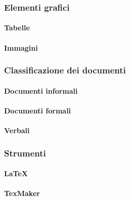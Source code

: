 \subsubsection{Elementi grafici}
 \paragraph{Tabelle} 
 \paragraph{Immagini}

\subsubsection{Classificazione dei documenti}
 \paragraph{Documenti informali}
 \paragraph{Documenti formali}
 \paragraph{Verbali}

\subsubsection{Strumenti}
 \paragraph{\LaTeX}
 \paragraph{TexMaker}